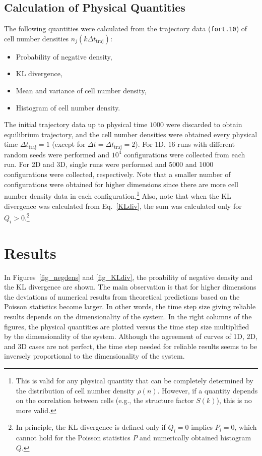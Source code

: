 \documentclass{article}
\begin{document}
\subsection{Calculation of Physical Quantities}

The following quantities were calculated from the trajectory data (\texttt{fort.10}) of cell number densities $n_j(k\Delta t_\mathrm{traj})$:
\begin{itemize}
\item Probability of negative density,
\item KL divergence,
\item Mean and variance of cell number density,
\item Histogram of cell number density.
\end{itemize}
The initial trajectory data up to physical time $1000$ were discarded to obtain equilibrium trajectory, and the cell number densities were obtained every physical time $\Delta t_\mathrm{traj}=1$ (except for $\Delta t=\Delta t_\mathrm{traj}=2$).
For 1D, $16$ runs with different random seeds were performed and $10^4$ configurations were collected from each run.
For 2D and 3D, single runs were performed and 5000 and 1000 configurations were collected, respectively.
Note that a smaller number of configurations were obtained for higher dimensions since there are more cell number density data in each configuration.\footnote{This is valid for any physical quantity that can be completely determined by the distribution of cell number density $\rho(n)$. However, if a quantity depends on the correlation between cells (e.g., the structure factor $S(k)$), this is no more valid.}
Also, note that when the KL divergence was calculated from Eq.~\eqref{KLdiv}, the sum was calculated only for $Q_i>0$.\footnote{In principle, the KL divergence is defined only if $Q_i=0$ implies $P_i=0$, which cannot hold for the Poisson statistics $P$ and numerically obtained histogram $Q$.}

\section{Results}

In Figures~\ref{fig_negdens} and \ref{fig_KLdiv}, the proability of negative density and the KL divergence are shown.
The main observation is that for higher dimensions the deviations of numerical results from theoretical predictions based on the Poisson statistics become larger.
In other words, the time step size giving reliable results depends on the dimensionality of the system.
In the right columns of the figures, the physical quantities are plotted versus the time step size multiplified by the dimensionality of the system.
Although the agreement of curves of 1D, 2D, and 3D cases are not perfect, the time step needed for reliable results seems to be inversely proportional to the dimensionality of the system.
\end{document}
